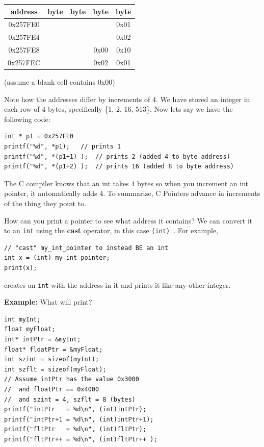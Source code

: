 \documentclass{article}	%
\begin{document}
\begin{tabular}{c|c|c|c|c|}
address & byte & byte & byte & byte \\\hline
0x257FE0  & & & & 0x01\\ \hline
0x257FE4  & & & & 0x02\\ \hline
0x257FE8  & & &0x00 &0x10 \\ \hline
0x257FEC  & & &0x02 &0x01 \\ \hline
\end{tabular}

{(assume a blank cell contains 0x00)}

Note how the addresses differ by increments of 4.	%
We have stored an integer in each row of 4 bytes, specifically \{1, 2, 16, 513\}.  
Now lets say we have the following code:	%

\begin{verbatim}
int * p1 = 0x257FE0
printf("%d", *p1);   // prints 1
printf("%d", *(p1+1) );  // prints 2 (added 4 to byte address)
printf("%d", *(p1+2) );  // prints 16 (added 8 to byte address)
\end{verbatim}

The C compiler knows that an int takes 4 bytes so when you increment an int pointer, it automatically adds 4. 
To summarize,
C Pointers advance in increments of the thing they
point to.



How can you print a pointer to see what address it contains?   We can convert it to an {\tt int} using the 	%
{\bf cast} operator, in this case {\tt (int) }.  For example, 


\begin{verbatim}
// "cast" my_int_pointer to instead BE an int
int x = (int) my_int_pointer;
print(x);
\end{verbatim}

creates an {\tt int} with the address in it and prints it like any other integer.




\noindent
{\bf Example:}    What will print?

\begin{verbatim}
int myInt;
float myFloat;
int* intPtr = &myInt;
float* floatPtr = &myFloat;
int szint = sizeof(myInt);
int szflt = sizeof(myFloat);
// Assume intPtr has the value 0x3000
//  and floatPtr == 0x4000
//  and szint = 4, szflt = 8 (bytes)
printf("intPtr   = %d\n", (int)intPtr);
printf("intPtr+1 = %d\n", (int)intPtr+1);
printf("fltPtr   = %d\n", (int)fltPtr);
printf("fltPtr++ = %d\n", (int)fltPtr++ );
\end{verbatim}
\end{document}
